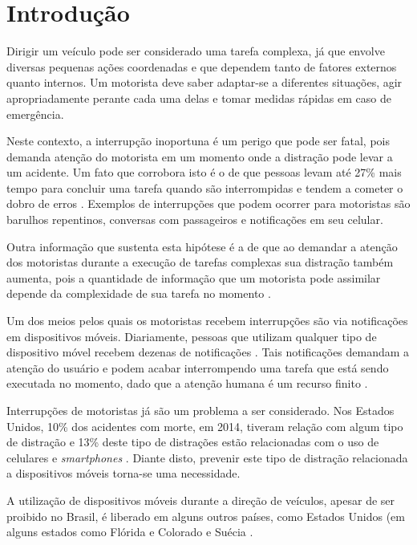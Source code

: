 \chapter{Introdução}
\label{introducao}

Dirigir um veículo pode ser considerado uma tarefa complexa, já que envolve diversas pequenas ações coordenadas e
que dependem tanto de fatores externos quanto internos. Um motorista deve saber adaptar-se a diferentes situações,
agir apropriadamente perante cada uma delas e tomar medidas rápidas em caso de emergência.

Neste contexto, a interrupção inoportuna é um perigo que pode ser fatal, pois demanda atenção do motorista em um momento
onde a distração pode levar a um acidente. Um fato que corrobora isto é o de que pessoas levam até 27\% mais tempo para
concluir uma tarefa quando são interrompidas e tendem a cometer o dobro de erros \cite{bailey2006need}. Exemplos de
interrupções que podem ocorrer para motoristas são barulhos repentinos, conversas com passageiros e notificações em
seu celular.

Outra informação que sustenta esta hipótese é a de que ao demandar a atenção dos motoristas durante a execução de
tarefas complexas sua distração também aumenta, pois a quantidade de informação que um motorista pode assimilar
depende da complexidade de sua tarefa no momento \cite{schneegass2013data}.

Um dos meios pelos quais os motoristas recebem interrupções são via notificações em dispositivos móveis.
Diariamente, pessoas que utilizam qualquer tipo de dispositivo móvel recebem dezenas de notificações
\cite{pielot2014situ}. Tais notificações demandam a atenção do usuário e podem acabar interrompendo uma tarefa que
está sendo executada no momento, dado que a atenção humana é um recurso finito \cite{simon1971designing}.

Interrupções de motoristas já são um problema a ser considerado. Nos Estados Unidos, 10\% dos acidentes com morte, em 2014, tiveram relação
com algum tipo de distração e 13\% deste tipo de distrações estão relacionadas com o uso de celulares e \textit{smartphones}
\cite{distracted2014}. Diante disto, prevenir este tipo de distração relacionada a dispositivos móveis torna-se uma necessidade.

A utilização de dispositivos móveis durante a direção de veículos, apesar de ser proibido no Brasil, é liberado em alguns
outros países, como Estados Unidos (em alguns estados como Flórida e Colorado \cite{cellphoneuse, distracteddriving} e Suécia \cite{swedendrive}.

